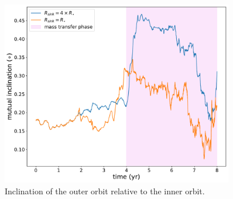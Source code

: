 \begin{figure}[H]
    \centering
    \includegraphics[width=0.9\textwidth]{Thesis/graphs/accretion_case/accretion_inc.pdf}
    \caption{Inclination of the outer orbit relative to the inner orbit.}
    \label{fig:accretion_inc}
\end{figure}
